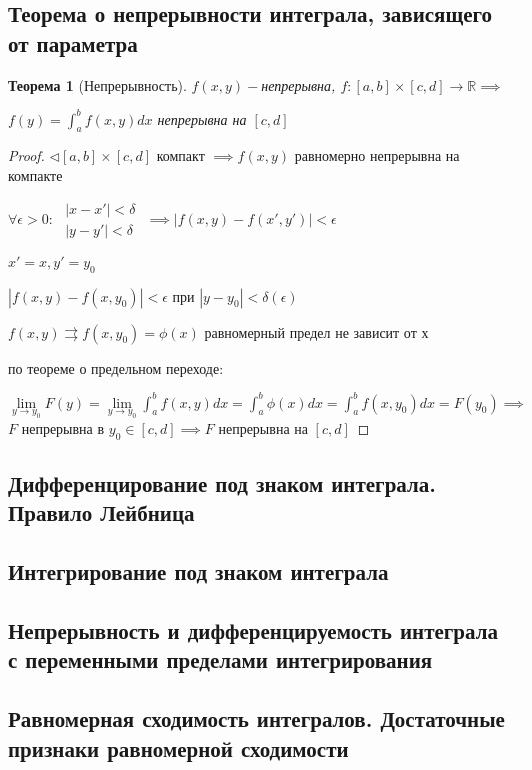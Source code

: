 \documentclass[a4paper]{article}
\newtheorem{theorem}{Теорема}[section]
\theoremstyle{definition}
\theoremstyle{remark}
\begin{document}
    \subsection{	Теорема о непрерывности интеграла, зависящего от параметра}
    \begin{theorem}[Непрерывность]

        $f(x,y) - $непрерывна, $f: [a,b]\times [c,d]\rightarrow \mathbb{R} \implies$
   
        $f(y) = \int_{a}^b f(x,y)dx $ непрерывна на $[c,d]$
   \end{theorem}
   \begin{proof}
        $\triangleleft [a,b]\times [c,d]$ компакт $\implies f(x,y)$ равномерно непрерывна на компакте
   
   $\forall \epsilon>0:$
   $
        \begin{array}{l}
             |x - x'|< \delta\\
             |y - y'|<\delta
        \end{array}
        $
        $\implies |f(x,y) - f(x', y')|<\epsilon$
   
        $x' = x, y' = y_0$
   
        $|f(x,y) - f(x,y_0)|<\epsilon$ при $|y - y_0|< \delta(\epsilon)$
   
        $f(x,y) \rightrightarrows f(x, y_0) = \phi(x)$ равномерный предел не зависит от х 
   
        по теореме о предельном переходе:
        
        $\lim\limits_{y\to y_0} F(y) = \lim\limits_{y\to y_0} \int_{a}^b f(x,y)dx = \int_{a}^b \phi(x) dx = \int_{a}^b f(x,y_0)dx  = F(y_0)\implies$
        $F$ непрерывна в $y_0 \in [c,d]\implies F$ непрерывна на $[c,d] $
   \end{proof}
    \subsection{	Дифференцирование под знаком интеграла. Правило Лейбница}
    \subsection{	Интегрирование под знаком интеграла}
    \subsection{	Непрерывность и дифференцируемость интеграла с переменными пределами интегрирования}
    \subsection{	Равномерная сходимость интегралов. Достаточные признаки равномерной сходимости}
\end{document}
